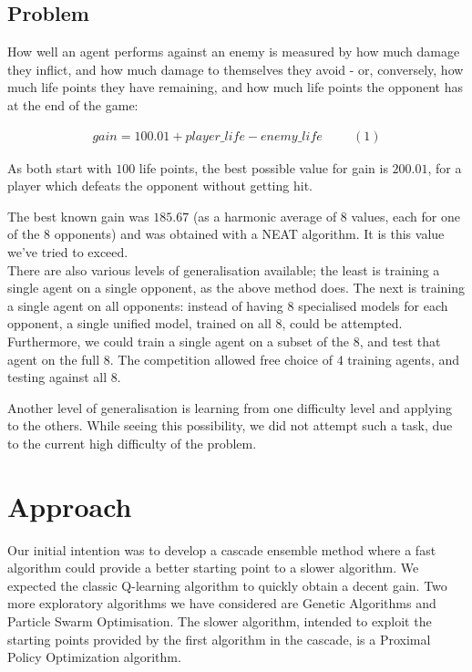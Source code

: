 \documentclass[conference]{IEEEtran}
\begin{document}
    \subsection{Problem}\label{subsec:problem}
    How well an agent performs against an enemy is measured by how much damage they inflict, and how much damage to themselves they avoid - or, conversely, how much life points they have remaining, and how much life points the opponent has at the end of the game:

    \begin{gather*}
      gain = 100.01 + player\_life - enemy\_life \hspace{1cm} (1)
    \end{gather*}

    As both start with $100$ life points, the best possible value for gain is $200.01$, for a player which defeats the opponent without getting hit.

    The best known gain was $185.67$ (as a harmonic average of $8$ values, each for one of the $8$ opponents)
    \cite{evoman} and was obtained with a NEAT\cite{neat} algorithm. It is this value we've tried to exceed.\\

    There are also various levels of generalisation available; the least is training a single agent on a single opponent, as the above method does. The next is training a single agent on all opponents: instead of having $8$ specialised models for each opponent, a single unified model, trained on all $8$, could be attempted. Furthermore, we could train a single agent on a subset of the $8$, and test that agent on the full $8$. The competition\cite{evoman_competition} allowed free choice of $4$ training agents, and testing against all $8$.

    Another level of generalisation is learning from one difficulty level and applying to the others. While seeing this possibility, we did not attempt such a task, due to the current high difficulty of the problem.
    
    \section{Approach}\label{sec:approach}
    Our initial intention was to develop a cascade ensemble method where a fast algorithm could provide a better starting point to a slower algorithm.
    We expected the classic Q-learning\cite{q_learning} algorithm to quickly obtain a decent gain. Two more exploratory algorithms we have considered are Genetic Algorithms\cite{genetic_algorithm} and Particle Swarm Optimisation\cite{pso}.
    The slower algorithm, intended to exploit the starting points provided by the first algorithm in the cascade, is a Proximal Policy Optimization\cite{ppo} algorithm.
\end{document}
